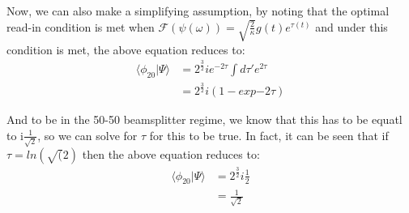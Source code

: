 \documentclass[12pt]{article}
\begin{document}
Now, we can also make a simplifying assumption, by noting that the optimal read-in condition is met when $\mathscr{F}(\psi(\omega)) = \sqrt{\frac{2}{\kappa}} g(t) e^{\tau(t)}$ and under this condition is met, the above equation reduces to:
\begin{align}
\langle \phi_{20}| \Psi \rangle & = 2^{\frac{3}{2}} i e^{-2\tau} \int d \tau' e^{2 \tau} \\
& = 2^{\frac{3}{2}} i\left(1- exp{-2\tau}\right)
\end{align}

And to be in the 50-50 beamsplitter regime, we know that this has to be equatl to i$\frac{1}{\sqrt{2}}$, so we can solve for $\tau$ for this to be true. In fact, it can be seen that if $\tau = ln(\sqrt(2)$ then the above equation reduces to:
\begin{align}
\langle \phi_{20}| \Psi \rangle &= 2^{\frac{3}{2}} i \frac{1}{2} \\
&= \frac{1}{\sqrt{2}}
\end{align}
\end{document}
